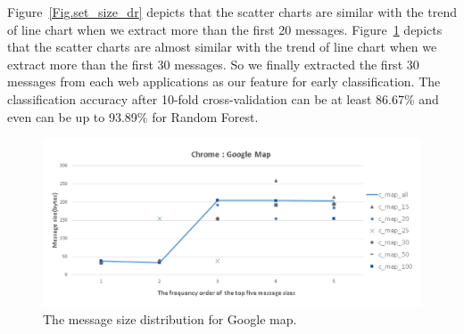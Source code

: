 \documentclass[preprint,12pt]{elsarticle}
\begin{document}
Figure~\ref{Fig.set_size_dr} depicts that the scatter charts are similar with the trend of line chart when we extract more than the first 20 messages. Figure~\ref{Fig.set_size_map} depicts that the scatter charts are almost similar with the trend of line chart when we extract more than the first 30 messages. So we finally extracted the first 30 messages from each web applications as our feature for early classification. The classification accuracy after 10-fold cross-validation can be at least 86.67\% and even can be up to 93.89\% for Random Forest.


\begin{figure}[H]
\begin{center} 
\includegraphics[width=1.1\textwidth]{early_map}
\end{center}
\caption{The message size distribution for Google map.}
\label{Fig.set_size_map}
\end{figure}
\end{document}
